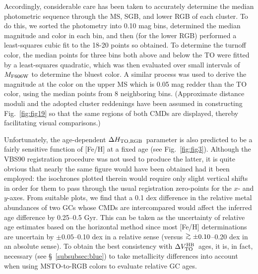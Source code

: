 \documentclass[12pt,preprint]{aastex}
\newcommand\delv{\Delta V^{\rm HB}_{\rm TO}}
\newcommand\delc{\Delta H_{\rm TO,RGB}}
\newcommand\gta{\mathrel{\hbox{\raise 0.6 ex \hbox{$>$}\kern
                   -1.7 ex\lower .5 ex\hbox{$\sim$}}}}
\begin{document}
Accordingly, considerable care has been taken to accurately determine the median
photometric sequence through the MS, SGB, and lower RGB of each cluster.  To do
this, we sorted the photometry into 0.10 mag bins, determined the median
magnitude and color in each bin, and then (for the lower RGB) performed a
least-squares cubic fit to the 18-20 points so obtained.  To determine the
turnoff color, the median points for three bins both above and below the TO
were fitted by a least-squares quadratic, which was then evaluated over small
intervals of $M_{\rm F606W}$ to determine the bluest color.  A similar process
was used to derive the magnitude at the color on the upper MS which is 0.05 mag
redder than the TO color, using the median points from 8 neighboring bins.
(Approximate distance moduli and the adopted cluster reddenings have been
assumed in constructing Fig.~\ref{fig:fig19} so that the same regions of both
CMDs are displayed, thereby facilitating visual comparisons.)

Unfortunately, the age-dependent $\delc$\ parameter is also predicted to be a
fairly sensitive function of [Fe/H] at a fixed age (see Fig.~\ref{fig:fig3}).
Although the VBS90 registration procedure was not used to produce the latter,
it is quite obvious that nearly the same figure would have been obtained had it
been employed: the isochrones plotted therein would require only slight vertical
shifts in order for them to pass through the usual registration zero-points for
the $x$- and $y$-axes.  From suitable plots, we find that a 0.1 dex difference
in the relative metal abundances of two GCs whose CMDs are intercompared would
affect the inferred age difference by 0.25--0.5 Gyr.  This can be taken as the
uncertainty of relative age estimates based on the horizontal method since most
[Fe/H] determinations are uncertain by $\pm 0.05$--0.10 dex in a relative sense
(versus $\gta \pm 0.10$--0.20 dex in an absolute sense).  To obtain the best
consistency with $\delv$\ ages, it is, in fact, necessary (see
\S~\ref{subsubsec:blue}) to take metallicity differences into account when
using MSTO-to-RGB colors to evaluate relative GC ages.
\end{document}
